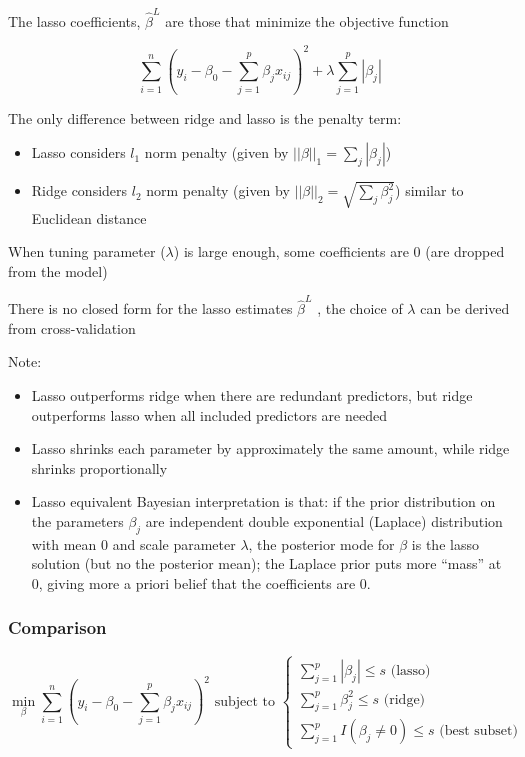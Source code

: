 \documentclass[
]{book}
\begin{document}
The lasso coefficients, \(\hat{\beta}^L\) are those that minimize the objective function

\[
\sum_{i=1}^n (y_i - \beta_0- \sum_{j=1}^p \beta_j x_{ij})^2 + \lambda\sum_{j=1}^p|\beta_j|
\]

The only difference between ridge and lasso is the penalty term:

\begin{itemize}
\item
  Lasso considers \(l_1\) norm penalty (given by \(||\beta||_1 = \sum_j |\beta_j|\))
\item
  Ridge considers \(l_2\) norm penalty (given by \(||\beta||_2 = \sqrt{\sum_j \beta_j^2}\)) similar to Euclidean distance
\end{itemize}

When tuning parameter (\(\lambda\)) is large enough, some coefficients are 0 (are dropped from the model)

There is no closed form for the lasso estimates \(\hat{\beta}^L\) , the choice of \(\lambda\) can be derived from cross-validation

Note:

\begin{itemize}
\item
  Lasso outperforms ridge when there are redundant predictors, but ridge outperforms lasso when all included predictors are needed
\item
  Lasso shrinks each parameter by approximately the same amount, while ridge shrinks proportionally
\item
  Lasso equivalent Bayesian interpretation is that: if the prior distribution on the parameters \(\beta_j\) are independent double exponential (Laplace) distribution with mean 0 and scale parameter \(\lambda\), the posterior mode for \(\beta\) is the lasso solution (but no the posterior mean); the Laplace prior puts more ``mass'' at 0, giving more a priori belief that the coefficients are 0.
\end{itemize}

\hypertarget{comparison}{%
\subsubsection{Comparison}\label{comparison}}

\[
\displaystyle{\min_{\beta}} \sum_{i=1}^n (y_i - \beta_0- \sum_{j=1}^p \beta_j x_{ij})^2 \text{ subject to }
\begin{cases}
\sum_{j=1}^p |\beta_j| \le s \text{ (lasso)} \\
\sum_{j=1}^p \beta_j^2 \le s \text{ (ridge)} \\
\sum_{j=1}^p I(\beta_j \neq 0) \le s \text{ (best subset)}
\end{cases}
\]
\end{document}
